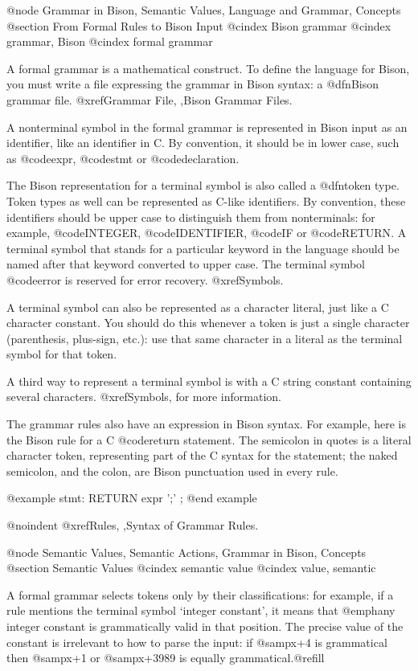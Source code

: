 @node Grammar in Bison, Semantic Values, Language and Grammar, Concepts
@section From Formal Rules to Bison Input
@cindex Bison grammar
@cindex grammar, Bison
@cindex formal grammar

A formal grammar is a mathematical construct.  To define the language
for Bison, you must write a file expressing the grammar in Bison syntax:
a @dfn{Bison grammar} file.  @xref{Grammar File, ,Bison Grammar Files}.

A nonterminal symbol in the formal grammar is represented in Bison input
as an identifier, like an identifier in C.  By convention, it should be
in lower case, such as @code{expr}, @code{stmt} or @code{declaration}.

The Bison representation for a terminal symbol is also called a @dfn{token
type}.  Token types as well can be represented as C-like identifiers.  By
convention, these identifiers should be upper case to distinguish them from
nonterminals: for example, @code{INTEGER}, @code{IDENTIFIER}, @code{IF} or
@code{RETURN}.  A terminal symbol that stands for a particular keyword in
the language should be named after that keyword converted to upper case.
The terminal symbol @code{error} is reserved for error recovery.
@xref{Symbols}.

A terminal symbol can also be represented as a character literal, just like
a C character constant.  You should do this whenever a token is just a
single character (parenthesis, plus-sign, etc.): use that same character in
a literal as the terminal symbol for that token.

A third way to represent a terminal symbol is with a C string constant
containing several characters.  @xref{Symbols}, for more information.

The grammar rules also have an expression in Bison syntax.  For example,
here is the Bison rule for a C @code{return} statement.  The semicolon in
quotes is a literal character token, representing part of the C syntax for
the statement; the naked semicolon, and the colon, are Bison punctuation
used in every rule.

@example
stmt:   RETURN expr ';'
        ;
@end example

@noindent
@xref{Rules, ,Syntax of Grammar Rules}.

@node Semantic Values, Semantic Actions, Grammar in Bison, Concepts
@section Semantic Values
@cindex semantic value
@cindex value, semantic

A formal grammar selects tokens only by their classifications: for example,
if a rule mentions the terminal symbol `integer constant', it means that
@emph{any} integer constant is grammatically valid in that position.  The
precise value of the constant is irrelevant to how to parse the input: if
@samp{x+4} is grammatical then @samp{x+1} or @samp{x+3989} is equally
grammatical.@refill

